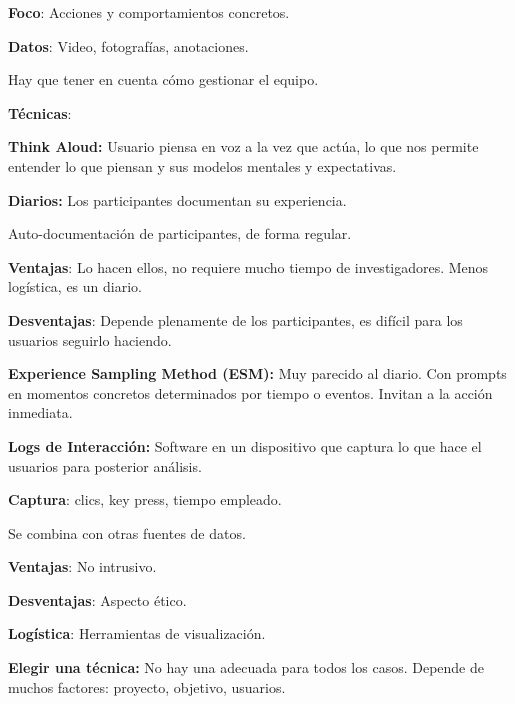 \documentclass[12pt]{report} %
\begin{document}
\textbf{Foco}: Acciones y comportamientos concretos.

\textbf{Datos}: Video, fotografías, anotaciones.

Hay que tener en cuenta cómo gestionar el equipo.

\textbf{Técnicas}:

\hspace{0pt} \textbf{Think Aloud:} Usuario piensa en voz a la vez que
actúa, lo que nos permite entender lo que piensan y sus modelos mentales
y expectativas.

\hspace{0pt} \textbf{Diarios:} Los participantes documentan su
experiencia.

\hspace{0pt} Auto-documentación de participantes, de forma regular.

\hspace{0pt} \textbf{Ventajas}: Lo hacen ellos, no requiere mucho tiempo
de investigadores. Menos logística, es un diario.

\hspace{0pt} \textbf{Desventajas}: Depende plenamente de los
participantes, es difícil para los usuarios seguirlo haciendo.

\hspace{0pt} \textbf{Experience Sampling Method (ESM):} Muy parecido al
diario. Con prompts en momentos concretos determinados por tiempo o
eventos. Invitan a la acción inmediata.

\hspace{0pt} \textbf{Logs de Interacción:} Software en un dispositivo
que captura lo que hace el usuarios para posterior análisis.

\hspace{0pt} \textbf{Captura}: clics, key press, tiempo empleado.

\hspace{0pt} Se combina con otras fuentes de datos.

\hspace{0pt} \textbf{Ventajas}: No intrusivo.

\hspace{0pt} \textbf{Desventajas}: Aspecto ético.

\hspace{0pt} \textbf{Logística}: Herramientas de visualización.

\textbf{Elegir una técnica:} No hay una adecuada para todos los casos.
Depende de muchos factores: proyecto, objetivo, usuarios.
\end{document}
